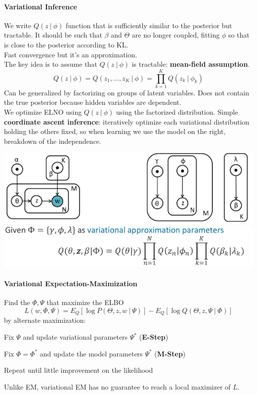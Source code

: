 \documentclass[10pt]{report}
\begin{document}
\paragraph{Variational Inference} We write $Q(z\:|\:\phi)$ function that is sufficiently similar to the posterior but tractable. It should be such that $\beta$ and $\Theta$ are no longer coupled, fitting $\phi$ so that is close to the posterior according to KL.\\
Fast convergence but it's an approximation.\\
The key idea is to assume that $Q(z\:|\:\phi)$ is tractable: \textbf{mean-field assumption}.
$$Q(z\:|\:\phi) = Q(z_1,\ldots,z_K\:|\:\phi)=\prod_{k=1}^K Q(z_k\:|\:\phi_k)$$
Can be generalized by factorizing on groups of latent variables. Does not contain the true posterior because hidden variables are dependent.\\
We optimize ELNO using $Q(z\:|\:\phi)$ using the factorized distribution. Simple \textbf{coordinate ascent inference}: iteratively optimize each variational distribution holding the others fixed, so when learning we use the model on the right, breakdown of the independence.\begin{center}
	\includegraphics[scale=0.5]{42.png}\\
	\includegraphics[scale=0.5]{43.png}
\end{center}
\paragraph{Variational Expectation-Maximization} Find the $\Phi, \Psi$ that maximize the ELBO
$$L(w,\Phi,\Psi) = E_Q[\log P(\Theta,z,w\:|\:\Psi)] - E_Q[\log Q(\Theta,z,\Psi\:|\:\Phi)]$$
by alternate maximization:
\begin{list}{}{}
	\item Fix $\Psi$ and update variational parameters $\Psi^*$ (\textbf{E-Step})
	\item Fix $\Phi = \Phi^*$ and update the model parameters $\Psi^*$ (\textbf{M-Step})
	\item Repeat until little improvement on the likelihood
\end{list}
Unlike EM, variational EM has no guarantee to reach a local maximizer of $L$.
\end{document}
